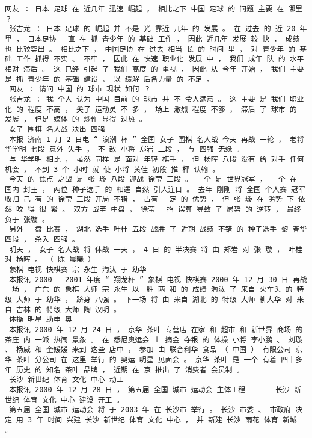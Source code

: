 \documentclass{article}
\begin{document}
\begin{Verbatim}[commandchars=\\\{\}]
 网友 ： 日本 足球 在 近几年 迅速 崛起 ， 相比之下 中国 足球 的 问题 主要 在 哪里 ？ 
 张吉龙 ： 日本 足球 的 崛起 并 不是 光 靠近 几年 的 发展 。 在 过去 的 近 20 年里 ， 日本足协 一直 在 抓 青少年 的 基础 工作 ， 因此 近几年 发展 较 快 ， 成绩 也 比较突出 。 相比之下 ， 中国足协 在 过去 相当 长 的 时间 里 ， 对 青少年 的 基础 工作 抓得 不实 、 不牢 ， 因此 在 快速 职业化 发展 中 ， 我们 成年 队 的 水平 相对 滞后 。 这 已经 引起 了 我们 高度 的 重视 ， 因此 从 今年 开始 ， 我们 主要 是 抓 青少年 的 基础 建设 ， 以 缓解 后备力量 的 不足 。 
 网友 ： 请问 中国 的 球市 现状 如何 ？ 
 张吉龙 ： 我 个人 认为 中国 目前 的 球市 并 不 令人满意 。 这 主要 是 我们 职业化 的 程度 不高 ， 尖子 运动员 不 多 ， 场上 激烈 程度 不够 ， 滞后 了 球市 的 发展 ， 但是 媒体 的 炒作 显得 过热 。 
 女子 围棋 名人战 决出 四强 
 本报 济南 1 月 2 日电 “ 浪潮 杯 ” 全国 女子 围棋 名人战 今天 再战 一轮 ， 老将 华学明 七段 意外 失手 ， 不 敌 小将 郑岩 二段 ， 与 四强 无缘 。 
 与 华学明 相比 ， 虽然 同样 是 面对 年轻 棋手 ， 但 杨晖 八段 没有 给 对手 任何 机会 ， 不到 3 个 小时 就 使 小将 黄佳 初段 推 枰 认输 。 
 今天 的 焦点 之战 是 张 璇 八段 迎战 徐莹 三段 。 一个 是 世界冠军 ， 一个 在 国内 封王 ， 两位 种子选手 的 相遇 自然 引人注目 。 去年 刚刚 将 全国 个人赛 冠军 收归 己 有 的 徐莹 三段 开局 不错 ， 占有 一定 的 优势 ， 但 张 璇 在 劣势 下 依然 咬 得 很 紧 。 双方 战至 中盘 ， 徐莹 一招 误算 导致 了 局势 的 逆转 ， 最终 负于 张璇 。 
 另外 一盘 比赛 ， 湖北 选手 叶桂 五段 战胜 了 近期 战绩 不错 的 种子选手 黎 春华 四段 ， 杀入 四强 。 
 明天 ， 女子 名人战 将 休战 一天 ， 4 日 的 半决赛 将 由 郑岩 对 张 璇 ， 叶桂对 杨晖 。 （ 陈 晨曦 ） 
 象棋 电视 快棋赛 宗 永生 淘汰 于 幼华 
 本报讯 2000 — 2001 年度 “ 翔龙杯 ” 象棋 电视 快棋赛 2000 年 12 月 30 日 再战 一场 ， 广东 的 象棋 大师 宗 永生 以一胜 两 和 的 成绩 淘汰 了 来自 火车头 的 特级 大师 于 幼华 ， 跻身 八强 。 下一场 将 由 来自 湖北 的 特级 大师 柳大华 对 来自 吉林 的 特级 大师 陶 汉明 。 
 体操 明星 助申 奥 
 本报讯 2000 年 12 月 24 日 ， 京华 茶叶 专营店 在家 和 超市 和 新世界 商场 的 茶庄 内 一派 热闹 景象 。 在 悉尼奥运会 上 摘金 夺银 的 体操 小将 李小鹏 、 刘璇 、 杨威 和 奎媛媛 来到 这些 店中 ， 参加 由 联合利华 食品 （ 中国 ） 有限公司 京华 茶叶 分公司 在 这里 举行 的 奥运 明星 见面会 。 京华 茶叶 是 一个 有着 四十多年 历史 的 知名 茶叶 品牌 ， 近期 在 京 推出 了 消费者 会员制 。 
 长沙 新世纪 体育 文化 中心 动工 
 本报讯 2000 年 12 月 28 日 ， 第五届 全国 城市 运动会 主体工程 — — — 长沙 新世纪 体育 文化 中心 建设 开工 。 
 第五届 全国 城市 运动会 将 于 2003 年 在 长沙市 举行 。 长沙 市委 、 市政府 决定 用 3 年 时间 兴建 长沙 新世纪 体育 文化 中心 ， 并 新建 长沙 雨花 体育 新城 。 

\end{Verbatim}
\end{document}
